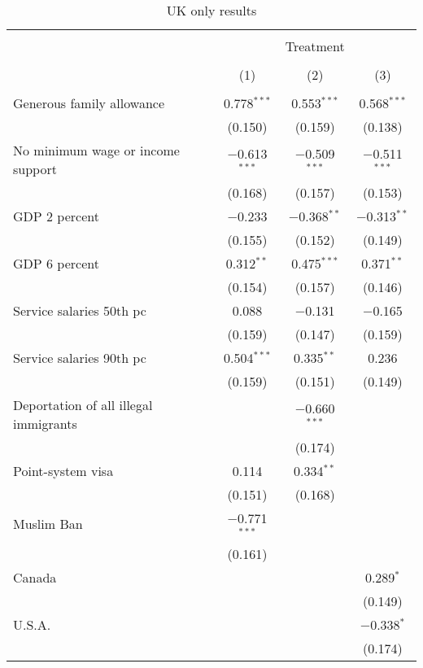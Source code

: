 
\begin{table}[!htbp] \centering 
  \caption{UK only results} 
  \label{tab:uk} 
\begin{tabular}{@{\extracolsep{5pt}}lccc} 
\\[-1.8ex]\hline 
\hline \\[-1.8ex] 
 & \multicolumn{3}{c}{Treatment} \\ 
\cline{2-4} 
\\[-1.8ex] & (1) & (2) & (3)\\ 
\hline \\[-1.8ex] 
 Generous family allowance & 0.778$^{***}$ & 0.553$^{***}$ & 0.568$^{***}$ \\ 
  & (0.150) & (0.159) & (0.138) \\ 
  No minimum wage or income support & $-$0.613$^{***}$ & $-$0.509$^{***}$ & $-$0.511$^{***}$ \\ 
  & (0.168) & (0.157) & (0.153) \\ 
  GDP 2 percent & $-$0.233 & $-$0.368$^{**}$ & $-$0.313$^{**}$ \\ 
  & (0.155) & (0.152) & (0.149) \\ 
  GDP 6 percent & 0.312$^{**}$ & 0.475$^{***}$ & 0.371$^{**}$ \\ 
  & (0.154) & (0.157) & (0.146) \\ 
  Service salaries 50th pc & 0.088 & $-$0.131 & $-$0.165 \\ 
  & (0.159) & (0.147) & (0.159) \\ 
  Service salaries 90th pc & 0.504$^{***}$ & 0.335$^{**}$ & 0.236 \\ 
  & (0.159) & (0.151) & (0.149) \\ 
  Deportation of all illegal immigrants &  & $-$0.660$^{***}$ &  \\ 
  &  & (0.174) &  \\ 
  Point-system visa & 0.114 & 0.334$^{**}$ &  \\ 
  & (0.151) & (0.168) &  \\ 
  Muslim Ban & $-$0.771$^{***}$ &  &  \\ 
  & (0.161) &  &  \\ 
  Canada &  &  & 0.289$^{*}$ \\ 
  &  &  & (0.149) \\ 
  U.S.A. &  &  & $-$0.338$^{*}$ \\ 
  &  &  & (0.174) \\ 

\end{tabular}
\end{table}
